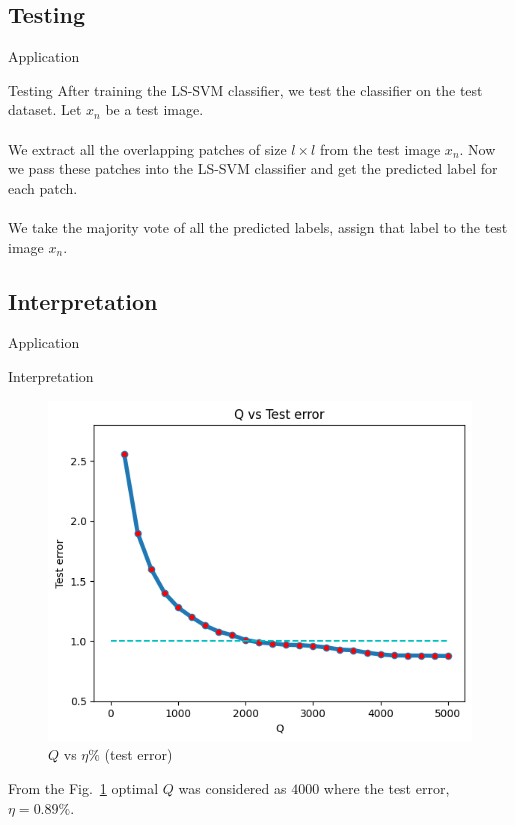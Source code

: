 \documentclass{beamer}
\begin{document}
    \subsection{Testing}
    \begin{frame}{Application}
        \begin{block}{Testing}
            \quad After training the LS-SVM classifier, we test the classifier on the test dataset.
            Let $x_{n}$ be a test image.                                                                     \\

            \quad                                                                                            \\ \quad We extract all the overlapping patches of size $l \times l$ from the test image $x_{n}$.
            Now we pass these patches into the LS-SVM classifier and get the predicted label for each patch. \\
            \quad                                                                                            \\ \quad We take the majority vote of all the predicted labels, assign that label to the test image $x_{n}$.
        \end{block}
    \end{frame}

    \subsection{Interpretation}
    \begin{frame}{Application}
        \begin{block}{Interpretation}
            \begin{figure}[htbp]
                \centering
                \includegraphics[scale=0.38]{output.png} %
                \caption{$Q$ vs $\eta\%$ (test error)}
                \label{fig}
            \end{figure}
            From the Fig.~\ref{fig} optimal $Q$ was considered as $4000$ where the test error, $\eta = 0.89\%$.
        \end{block}
    \end{frame}
\end{document}
